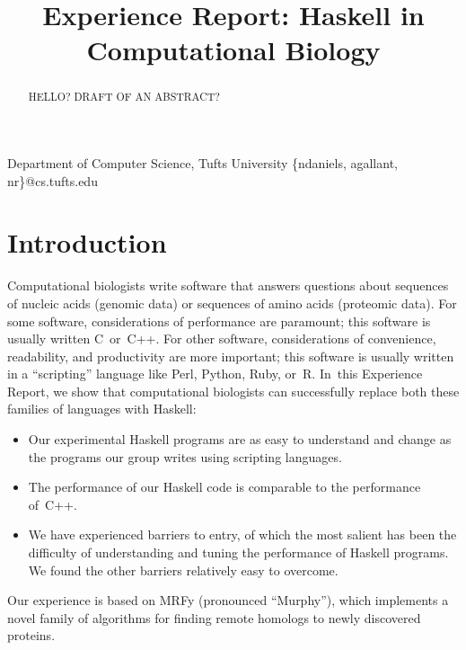 \documentclass[preprint,nonatbib,blockstyle,nocopyrightspace,times]{sigplanconf}
\begin{document}
\copyrightdata{[to be supplied]} 


\title{Experience Report: Haskell in Computational Biology}

           {Department of Computer Science, Tufts University}
           {\{ndaniels, agallant, nr\}@cs.tufts.edu}


\maketitle

\begin{abstract}
HELLO?  DRAFT OF AN ABSTRACT?
\end{abstract}

% 
% 

\section{Introduction}

Computational biologists write software that answers questions about 
sequences of nucleic acids (genomic data) or sequences of amino 
acids (proteomic data). 
For some software, considerations of performance are paramount; this
software is usually written C~or~C++. 
For other software, considerations of convenience, readability, and
productivity are more important;
this software is usually written in a ``scripting'' language like
Perl, Python, Ruby, or~R.
In~this Experience Report, we show that computational biologists can
successfully replace both these families of languages with Haskell:
\begin{itemize}
\item
Our experimental Haskell programs are as easy to understand and change
 as the programs our group writes using scripting languages.
\item
The performance of our Haskell code is comparable to the performance
of~C++.
\item
We have experienced barriers to entry, of which the most salient has been
the difficulty of understanding and tuning  the performance of Haskell
programs. 
We found the other barriers 
relatively easy to overcome.
\end{itemize}
Our experience is based on MRFy (pronounced ``Murphy''), which
implements a novel family of algorithms for finding remote homologs to 
newly discovered proteins. 
\end{document}
